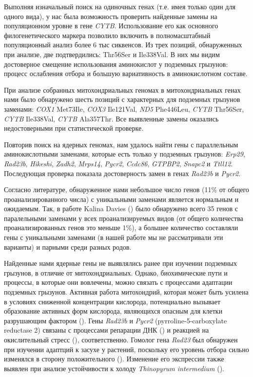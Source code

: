 Выполняя изначальный поиск на одиночных генах (т.е. имея только один для одного вида), у нас была возможность проверить найденные замены на популяционном уровне в гене \textit{CYTB}. Использование его как основного филогенетического маркера позволило включить в полномасштабный популяционный анализ более 6 тыс сиквенсов. Из трех позиций, обнаруженных при анализе, две подтвердились: Thr56Ser и Ile338Val. В них мы видим достоверное смещение использования аминокислот у подземных грызунов: процесс ослабления отбора и большую вариативность в аминокислотном составе.

При анализе собранных митохондриальных геномах в митохондриальных генах нами было обнаружено шесть позиций с характерных для подземных грызунов заменами: \textit{COX1} Met73Ile, \textit{COX3} Ile121Val, \textit{ND5} Phe446Leu, \textit{CYTB} Thr56Ser, \textit{CYTB} Ile338Val, \textit{CYTB} Ala357Thr. Все выявленные замены оказались недостоверными при статистической проверке. 

Повторив поиск на ядерных геномах, нам удалось найти гены с параллельным аминокислотными заменами, которые есть только у подземных грызунов: \textit{Erp29}, \textit{Rad23b}, \textit{Hikeshi}, \textit{Zadh2}, \textit{Mrps14}, \textit{Pycr2}, \textit{Ccdc86}, \textit{GTPBP2}, \textit{Snapc2} и \textit{Ttll12}. Последующая проверка показала достоверность замен в генах \textit{Rad23b} и \textit{Pycr2}.

Согласно литературе, обнаруженное нами небольшое число генов (11\% от общего проанализированного числа) с уникальными заменами  является нормальным и ожидаемым. Так, в работе Kalina Davies (\cite{Davies2018}) было обнаружено всего 35 генов с паралельными заменами у всех проанализируемых видов (от общего количества проанализированных генов это меньше 1\%), а большее количество составляли гены с уникальными заменами (в нашей работе мы не рассматривали эти варианты) и парными среди разных родов. 

Найденные нами ядерные гены не выявлялись ранее при изучении подземных грызунов, в отличие от митохондриальных. Однако, биохимические пути и процессы, в которые они вовлечены, можно связать с процессами адаптации подземных грызунов. Активная работа митохондрий, которая может быть усилена в условиях сниженной концентрации кислорода, потенциально вызывает образование активных форм кислорода, являющихся опасным для клетки разрушающим фактором (\cite{Turrens2003}). Гены \textit{Rad23b} и \textit{Pycr2} (pyrroline-5-carboxylate reductase 2) связаны с процессами репарации ДНК (\cite{Pohjoismaki2012}) и реакцией на окислительный стресс (\cite{Kuo2015}), соответственно. Гомолог гена \textit{Rad23} был обнаружен при изучении адаптций к засухе у растений, поскольку его уровень отбора сильно изменялся в сторону положительного (\cite{Zhang2013b}). Изменение его экспрессии также выявлен при анализе устойчивости к холоду \textit{Thinopyrum intermedium} (\cite{Jaikumar2020}). 

